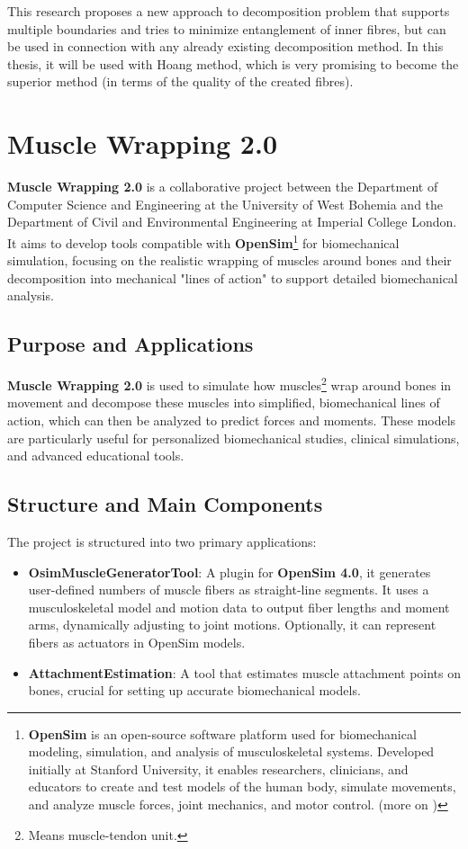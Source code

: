 \documentclass[english, bc, kiv, he, iso690alph, pdf, viewonly]{fasthesis}
\begin{document}
This research proposes a new approach to decomposition problem that supports multiple boundaries and tries to minimize entanglement of inner fibres, but can be used in connection with any already existing decomposition method. In this thesis, it will be used with Hoang method, which is very promising to become the superior method (in terms of the quality of the created fibres).

\chapter{Muscle Wrapping 2.0}

\textbf{Muscle Wrapping 2.0} is a collaborative project between the Department of Computer Science and Engineering at the University of West Bohemia and the Department of Civil and Environmental Engineering at Imperial College London. It aims to develop tools compatible with \textbf{OpenSim}\footnote{\textbf{OpenSim} is an open-source software platform used for biomechanical modeling, simulation, and analysis of musculoskeletal systems. Developed initially at Stanford University, it enables researchers, clinicians, and educators to create and test models of the human body, simulate movements, and analyze muscle forces, joint mechanics, and motor control. (more on \cite{OS24})} for biomechanical simulation, focusing on the realistic wrapping of muscles around bones and their decomposition into mechanical "lines of action" to support detailed biomechanical analysis.

\section{Purpose and Applications}
\textbf{Muscle Wrapping 2.0} is used to simulate how muscles\footnote{Means muscle-tendon unit.} wrap around bones in movement and decompose these muscles into simplified, biomechanical lines of action, which can then be analyzed to predict forces and moments. These models are particularly useful for personalized biomechanical studies, clinical simulations, and advanced educational tools.

\newpage
\section{Structure and Main Components}
The project is structured into two primary applications:
\begin{itemize}
	\item \textbf{OsimMuscleGeneratorTool}: A plugin for \textbf{OpenSim 4.0}, it generates user-defined numbers of muscle fibers as straight-line segments. It uses a musculoskeletal model and motion data to output fiber lengths and moment arms, dynamically adjusting to joint motions. Optionally, it can represent fibers as actuators in OpenSim models.
	\item \textbf{AttachmentEstimation}: A tool that estimates muscle attachment points on bones, crucial for setting up accurate biomechanical models.
\end{itemize}
\end{document}
